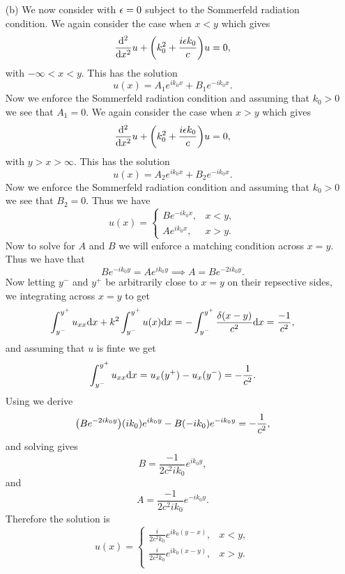 \documentclass[12pt]{report}
\begin{document}
\begin{solution}
\begin{enumerate}
        \item [(b)]
        We now consider  with ${\epsilon} = 0$ subject to the Sommerfeld radiation condition. We again consider the case when $x<y$ which gives
        \[
            \frac{\mathrm{d}^{2} }{\mathrm{d} x^{2}}u + {\left(k_0^2 + \frac{i{\epsilon} k_0}{c}\right)}u = 0,
        \]      
        with $-\infty < x < y$. This has the solution
        \[
            u(x) = A_1 e^{ik_0 x} + B_1 e^{-ik_0 x}.
        \]
        Now we enforce the Sommerfeld radiation condition and assuming that $k_0 > 0$ we see that $A_1 = 0$. We again consider the case when $x>y$ which gives
        \[
            \frac{\mathrm{d}^{2} }{\mathrm{d} x^{2}}u + {\left(k_0^2 + \frac{i{\epsilon} k_0}{c}\right)}u = 0,
        \]      
        with $y > x > \infty$. This has the solution
        \[
            u(x) = A_2 e^{ik_0 x} + B_2 e^{-ik_0 x}.
        \]
        Now we enforce the Sommerfeld radiation condition and assuming that $k_0 > 0$ we see that $B_2 = 0$. Thus we have
        \[
            u(x) = \begin{cases}
                B e^{-ik_0 x}, &x < y,\\
                A e^{ik_0 x}, &x > y.
            \end{cases}
        \] 
        Now to solve for $A$ and $B$ we will enforce a matching condition across $x = y$. Thus we have that 
        \[
            B e^{-i k_0 y} = A e^{i k_0 y} \implies A = B e^{-2 i k_0 y}.
        \]  
        Now letting $y^-$ and $y^+$ be arbitrarily close to $x = y$ on their repsective sides, we integrating across $x=y$ to get 
        \[
            \int_{y^-}^{y^+} u_{xx}{\mathrm{d}} x +  k^2\int_{y^-}^{y^+} u(x) {\mathrm{d}} x = -\int_{y^-}^{y^+} \frac{\delta(x -y)}{c^2} {\mathrm{d}} x = \frac{-1}{c^2},
        \] 
        and assuming that $u$ is finte we get
        \[
            \int_{y^-}^{y^+} u_{xx}{\mathrm{d}} x = u_x(y^+) - u_x(y^-) = - \frac{1}{c^2}.
        \]
        Using  we derive   
        \[
            {\left(B e^{-2ik_0 y}\right)}(ik_0)e^{i k_0 y} - B(-ik_0)e^{-ik_0y} = - \frac{1}{c^2},
        \]
        and solving gives
        \[
            B = \frac{-1}{2c^2 i k_0}e^{ik_0 y},
        \]
        and
        \[
            A = \frac{-1}{2c^2 i k_0}e^{-ik_0 y}.
        \]
        Therefore the solution is
        \[
            u(x) = \begin{cases}
                \frac{i}{2c^2 k_0}e^{ik_0(y-x)}, & x < y,\\ 
                \frac{i}{2c^2 k_0}e^{ik_0(x-y)}, & x > y.\\ 
            \end{cases}
        \] 
        

\end{enumerate}
\end{solution}
\end{document}
